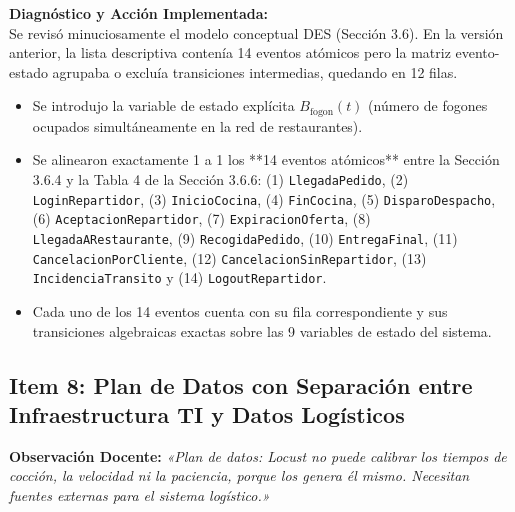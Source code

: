 \documentclass[11pt,letterpaper]{article}
\begin{document}
\vspace{0.4em}
\noindent \textbf{Diagnóstico y Acción Implementada:} \\
Se revisó minuciosamente el modelo conceptual DES (Sección 3.6). En la versión anterior, la lista descriptiva contenía 14 eventos atómicos pero la matriz evento-estado agrupaba o excluía transiciones intermedias, quedando en 12 filas.
\begin{itemize}[leftmargin=1.5em, itemsep=0.2em]
    \item Se introdujo la variable de estado explícita $B_{\text{fogon}}(t)$ (número de fogones ocupados simultáneamente en la red de restaurantes).
    \item Se alinearon exactamente 1 a 1 los **14 eventos atómicos** entre la Sección 3.6.4 y la Tabla 4 de la Sección 3.6.6:
    (1) \texttt{LlegadaPedido}, (2) \texttt{LoginRepartidor}, (3) \texttt{InicioCocina}, (4) \texttt{FinCocina}, (5) \texttt{DisparoDespacho}, (6) \texttt{AceptacionRepartidor}, (7) \texttt{ExpiracionOferta}, (8) \texttt{LlegadaARestaurante}, (9) \texttt{RecogidaPedido}, (10) \texttt{EntregaFinal}, (11) \texttt{CancelacionPorCliente}, (12) \texttt{CancelacionSinRepartidor}, (13) \texttt{IncidenciaTransito} y (14) \texttt{LogoutRepartidor}.
    \item Cada uno de los 14 eventos cuenta con su fila correspondiente y sus transiciones algebraicas exactas sobre las 9 variables de estado del sistema.
\end{itemize}

\subsection{Item 8: Plan de Datos con Separación entre Infraestructura TI y Datos Logísticos}
\noindent \textbf{Observación Docente:} \textit{«Plan de datos: Locust no puede calibrar los tiempos de cocción, la velocidad ni la paciencia, porque los genera él mismo. Necesitan fuentes externas para el sistema logístico.»}
\end{document}
